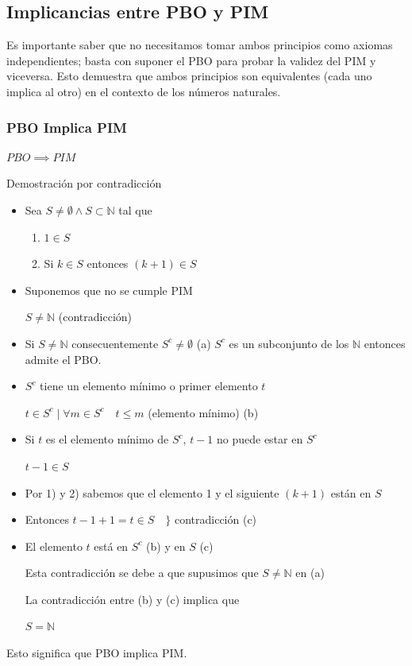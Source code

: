 \documentclass{article}
\begin{document}
\subsection{Implicancias entre PBO y PIM}
\label{sec:implicancias-entre-pbo-pim}

Es importante saber que no necesitamos tomar ambos principios como axiomas independientes; basta con suponer el PBO para probar la validez del PIM y viceversa. Esto demuestra que ambos principios son equivalentes (cada uno implica al otro) en el contexto de los números naturales.

\subsubsection{PBO Implica PIM}
\label{sec:pbo_implica_pim}

\noindent $PBO \implies PIM$

\bigskip

\noindent Demostración por contradicción
\begin{itemize}
\item Sea $S \neq \emptyset \land S \subset \mathbb{N}$ tal que
\begin{enumerate}
    \item $1 \in S$
    \item Si $k \in S$ entonces $(k+1) \in S$
\end{enumerate}
\item Suponemos que no se cumple PIM 

{$S \neq \mathbb{N}$ (contradicción)}

\item Si $S \neq \mathbb{N}$ consecuentemente $S^c \neq \emptyset$ (a) $S^c$ es un subconjunto de los $\mathbb{N}$ entonces admite el PBO.
\item $S^c$ tiene un elemento mínimo o primer elemento $t$

$t \in S^c \mid \forall m \in S^c \quad t \leq m$ (elemento mínimo) (b)

\item Si $t$ es el elemento mínimo de $S^c$, $t-1$ no puede estar en $S^c$

$t-1 \in S$

\item Por 1) y 2) sabemos que el elemento 1 y el siguiente $(k+1)$ están en $S$
\item Entonces $t-1+1 = t \in S \quad \}$ contradicción (c)
\item El elemento $t$ está en $S^c$ (b) y en $S$ (c)

Esta contradicción se debe a que supusimos que $S \neq \mathbb{N}$ en (a)

La contradicción entre (b) y (c) implica que

$S = \mathbb{N}$
\end{itemize}
\noindent Esto significa que PBO implica PIM.
\end{document}

